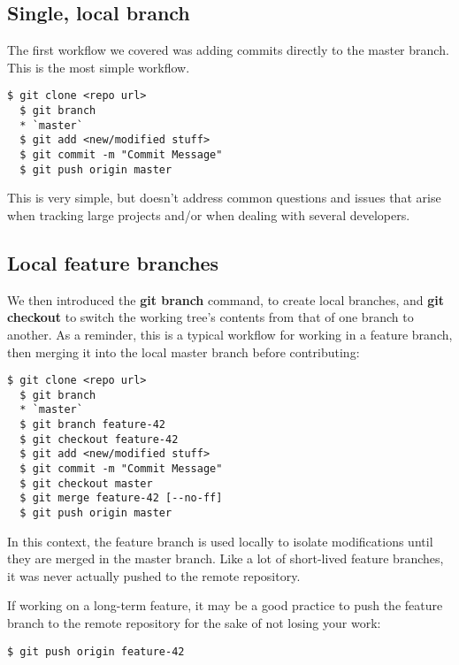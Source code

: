 \documentclass{../common/tufte-latex/tufte-handout}
\begin{document}
\subsection{Single, local branch}
The first workflow we covered was adding commits directly to the master branch.
This is the most simple workflow.
\begin{lstlisting}[style=BashInputStyle]
  $ git clone <repo url>
  $ git branch
  * `master`
  $ git add <new/modified stuff>
  $ git commit -m "Commit Message"
  $ git push origin master
\end{lstlisting}

This is very simple, but doesn't address common questions and issues that arise when tracking large projects and/or when dealing with several developers.

\subsection{Local feature branches}
We then introduced the \textbf{git branch} command, to create local branches, and \textbf{git checkout} to switch the working tree's contents from that of one branch to another.
As a reminder, this is a typical workflow for working in a feature branch, then merging it into the local master branch before contributing:

\begin{lstlisting}[style=BashInputStyle]
  $ git clone <repo url>
  $ git branch
  * `master`
  $ git branch feature-42 
  $ git checkout feature-42
  $ git add <new/modified stuff>
  $ git commit -m "Commit Message"
  $ git checkout master
  $ git merge feature-42 [--no-ff]
  $ git push origin master
\end{lstlisting}

In this context, the feature branch is used locally to isolate modifications until they are merged in the master branch.
Like a lot of short-lived feature branches, it was never actually pushed to the remote repository.

If working on a long-term feature, it may be a good practice to push the feature branch to the remote repository for the sake of not losing your work:

\begin{lstlisting}[style=BashInputStyle]
  $ git push origin feature-42
\end{lstlisting}
\end{document}
